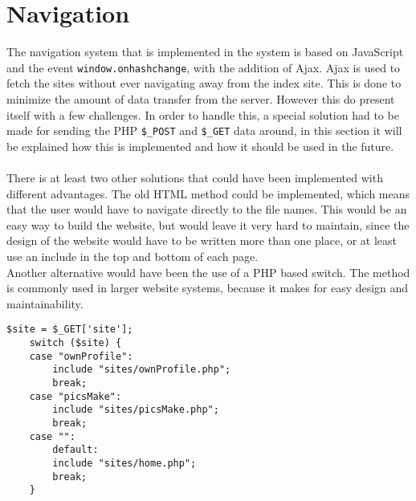 \section{Navigation}
\label{sec:navigation}
The navigation system that is implemented in the system is based on JavaScript and the event \texttt{window.onhashchange}, with the addition of Ajax.
Ajax is used to fetch the sites without ever navigating away from the index site. This is done to minimize the amount of data transfer from the server. However this do present itself with a few challenges. In order to handle this, a special solution had to be made for sending the PHP \texttt{\$\_POST} and \texttt{\$\_GET} data around, in this section it will be explained how this is implemented and how it should be used in the future.\\
\\
There is at least two other solutions that could have been implemented with different advantages. The old HTML method could be implemented, which means that the user would have to navigate directly to the file names. This would be an easy way to build the website, but would leave it very hard to maintain, since the design of the website would have to be written more than one place, or at least use an include in the top and bottom of each page.\\
Another alternative would have been the use of a PHP based switch. The method is commonly used in larger website systems, because it makes for easy design and maintainability.
\lstset{language=PHP}
\begin{lstlisting}[firstline=1,caption={A PHP switch Example},label=lst:phpSwitch]
	$site = $_GET['site'];
	switch ($site) {
    case "ownProfile":
        include "sites/ownProfile.php";
        break;
    case "picsMake":
        include "sites/picsMake.php";
        break;
    case "":
		default:
        include "sites/home.php";
        break;
	}
\end{lstlisting}

